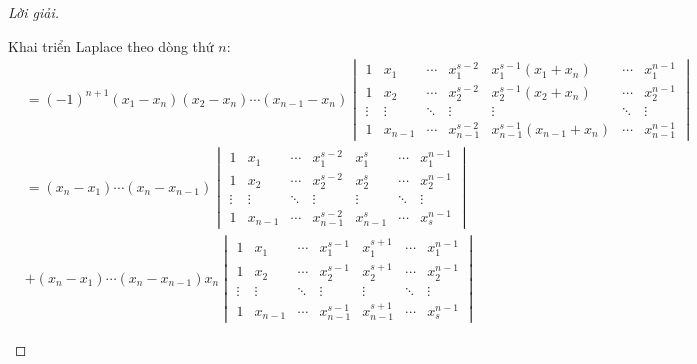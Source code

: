 \begin{proof}[Lời giải]
\begin{enumerate}[label = (\alph*)]
              Khai triển Laplace theo dòng thứ $n$:
              \begin{align*}
                   & = {(-1)}^{n+1}(x_{1} - x_{n})(x_{2} - x_{n})\cdots (x_{n-1} - x_{n})
                  \begin{vmatrix}
                      1      & x_{1}   & \cdots & x_{1}^{s-2}   & x_{1}^{s-1}(x_{1} + x_{n})     & \cdots & x_{1}^{n-1}   \\
                      1      & x_{2}   & \cdots & x_{2}^{s-2}   & x_{2}^{s-1}(x_{2} + x_{n})     & \cdots & x_{2}^{n-1}   \\
                      \vdots & \vdots  & \ddots & \vdots        & \vdots                         & \ddots & \vdots        \\
                      1      & x_{n-1} & \cdots & x_{n-1}^{s-2} & x_{n-1}^{s-1}(x_{n-1} + x_{n}) & \cdots & x_{n-1}^{n-1}
                  \end{vmatrix}                                                    \\
                   & = (x_{n} - x_{1})\cdots (x_{n} - x_{n-1})
                  \begin{vmatrix}
                      1      & x_{1}   & \cdots & x_{1}^{s-2}   & x_{1}^{s}   & \cdots & x_{1}^{n-1} \\
                      1      & x_{2}   & \cdots & x_{2}^{s-2}   & x_{2}^{s}   & \cdots & x_{2}^{n-1} \\
                      \vdots & \vdots  & \ddots & \vdots        & \vdots      & \ddots & \vdots      \\
                      1      & x_{n-1} & \cdots & x_{n-1}^{s-2} & x_{n-1}^{s} & \cdots & x_{s}^{n-1}
                  \end{vmatrix}                                                                         \\
                   & + (x_{n} - x_{1})\cdots (x_{n} - x_{n-1})
                  x_{n}\begin{vmatrix}
                           1      & x_{1}   & \cdots & x_{1}^{s-1}   & x_{1}^{s+1}   & \cdots & x_{1}^{n-1} \\
                           1      & x_{2}   & \cdots & x_{2}^{s-1}   & x_{2}^{s+1}   & \cdots & x_{2}^{n-1} \\
                           \vdots & \vdots  & \ddots & \vdots        & \vdots        & \ddots & \vdots      \\
                           1      & x_{n-1} & \cdots & x_{n-1}^{s-1} & x_{n-1}^{s+1} & \cdots & x_{s}^{n-1}

\end{vmatrix}
\end{align*}
\end{enumerate}
\end{proof}
